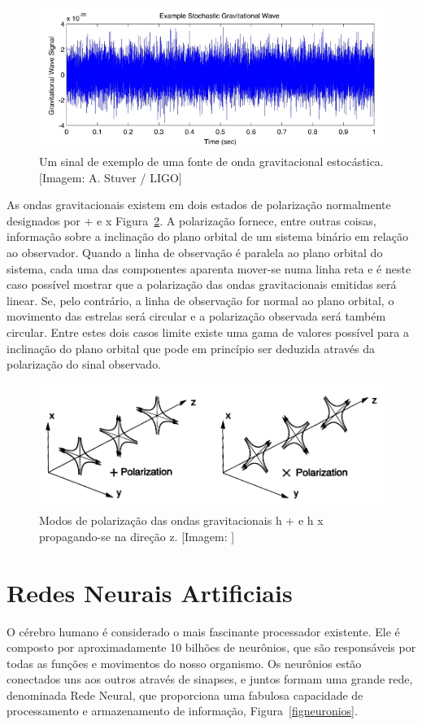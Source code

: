 \begin{figure}[ht]
\centering
\includegraphics[width=.9\textwidth]{figuras/stochastic_tn.jpg}
\caption{Um sinal de exemplo de uma fonte de onda gravitacional estocástica. [Imagem: A. Stuver / LIGO]}
\label{figondaestocastica}
\end{figure}

As ondas gravitacionais existem em dois estados de polarização normalmente designados por + e x Figura~\ref{figpolarization}. A polarização fornece, entre outras coisas, informação sobre a inclinação do plano orbital de um sistema binário em relação ao observador. Quando a linha de observação é paralela ao plano orbital do sistema, cada uma das componentes aparenta mover-se numa linha reta e é neste caso possível mostrar que a polarização das ondas gravitacionais emitidas será linear. Se, pelo contrário, a linha de observação for normal ao plano orbital, o movimento das estrelas será circular e a polarização observada será também circular. Entre estes dois casos limite existe uma gama de valores possível para a inclinação do plano orbital que pode em princípio ser deduzida através da polarização do sinal observado.

\begin{figure}[ht]
\centering
\includegraphics[width=.9\textwidth]{figuras/polarization.png}
\caption{Modos de polarização das ondas gravitacionais h + e h x propagando-se na direção z. [Imagem: \cite{centrella2010black}]}
\label{figpolarization}
\end{figure}

\section{Redes Neurais Artificiais}
O cérebro humano é considerado o mais fascinante processador existente. Ele é composto por aproximadamente 10 bilhões de neurônios, que são responsáveis por todas as funções e movimentos do nosso organismo. Os neurônios estão conectados uns aos outros através de sinapses, e juntos formam uma grande rede, denominada Rede Neural, que proporciona uma fabulosa capacidade de processamento e armazenamento de informação, Figura~\ref{figneuronios}.

